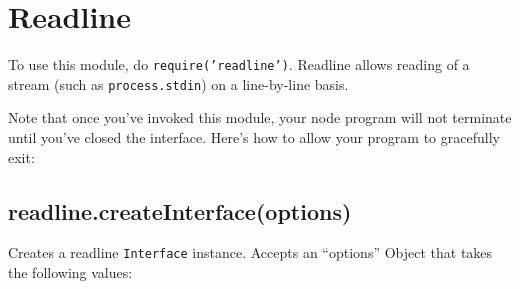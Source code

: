 \section{Readline}

\begin{Shaded}
\begin{Highlighting}[]
\NormalTok{: } 
\end{Highlighting}
\end{Shaded}

To use this module, do \texttt{require('readline')}. Readline allows
reading of a stream (such as \texttt{process.stdin}) on a line-by-line
basis.

Note that once you've invoked this module, your node program will not
terminate until you've closed the interface. Here's how to allow your
program to gracefully exit:

\begin{Shaded}
\begin{Highlighting}[]
 \NormalTok{);}

 \NormalTok{(\{}
  \NormalTok{: }\NormalTok{,}
  \NormalTok{: }
\NormalTok{\});}

\NormalTok{(}\NormalTok{, }
  \NormalTok{(}

  \NormalTok{();}
\NormalTok{\});}
\end{Highlighting}
\end{Shaded}

\subsection{readline.createInterface(options)}

Creates a readline \texttt{Interface} instance. Accepts an ``options''
Object that takes the following values:

